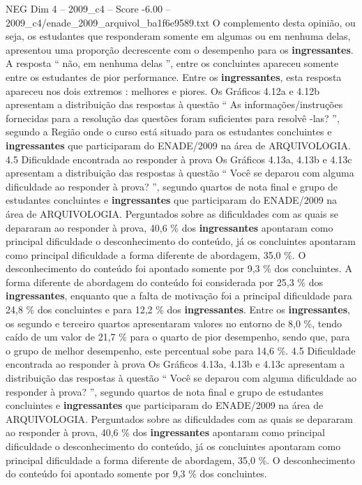\begin{textsample}{NEG Dim 4 – 2009\_c4 – Score -6.00 – 2009\_c4/enade\_2009\_arquivol\_ba1f6e9589.txt}
O complemento desta opinião, ou seja, os estudantes que responderam somente em algumas ou em nenhuma delas, apresentou uma proporção decrescente com o desempenho para os \textbf{ingressantes}.
A resposta “ não, em nenhuma delas ”, entre os concluintes apareceu somente entre os estudantes de pior performance.
Entre os \textbf{ingressantes}, esta resposta apareceu nos dois extremos : melhores e piores.
Os Gráficos 4.12a e 4.12b apresentam a distribuição das respostas à questão “ As informações/instruções fornecidas para a resolução das questões foram suficientes para resolvê -las? ”, segundo a Região onde o curso está situado para os estudantes concluintes e \textbf{ingressantes} que participaram do ENADE/2009 na área de ARQUIVOLOGIA. 4.5 Dificuldade encontrada ao responder à prova Os Gráficos 4.13a, 4.13b e 4.13c apresentam a distribuição das respostas à questão “ Você se deparou com alguma dificuldade ao responder à prova? ”, segundo quartos de nota final e grupo de estudantes concluintes e \textbf{ingressantes} que participaram do ENADE/2009 na área de ARQUIVOLOGIA.
Perguntados sobre as dificuldades com as quais se depararam ao responder à prova, 40,6 \% dos \textbf{ingressantes} apontaram como principal dificuldade o desconhecimento do conteúdo, já os concluintes apontaram como principal dificuldade a forma diferente de abordagem, 35,0 \%.
O desconhecimento do conteúdo foi apontado somente por 9,3 \% dos concluintes.
A forma diferente de abordagem do conteúdo foi considerada por 25,3 \% dos \textbf{ingressantes}, enquanto que a falta de motivação foi a principal dificuldade para 24,8 \% dos concluintes e para 12,2 \% dos \textbf{ingressantes}.
Entre os \textbf{ingressantes}, os segundo e terceiro quartos apresentaram valores no entorno de 8,0 \%, tendo caído de um valor de 21,7 \% para o quarto de pior desempenho, sendo que, para o grupo de melhor desempenho, este percentual sobe para 14,6 \%. 4.5 Dificuldade encontrada ao responder à prova Os Gráficos 4.13a, 4.13b e 4.13c apresentam a distribuição das respostas à questão “ Você se deparou com alguma dificuldade ao responder à prova? ”, segundo quartos de nota final e grupo de estudantes concluintes e \textbf{ingressantes} que participaram do ENADE/2009 na área de ARQUIVOLOGIA.
Perguntados sobre as dificuldades com as quais se depararam ao responder à prova, 40,6 \% dos \textbf{ingressantes} apontaram como principal dificuldade o desconhecimento do conteúdo, já os concluintes apontaram como principal dificuldade a forma diferente de abordagem, 35,0 \%.
O desconhecimento do conteúdo foi apontado somente por 9,3 \% dos concluintes.

\end{textsample}
